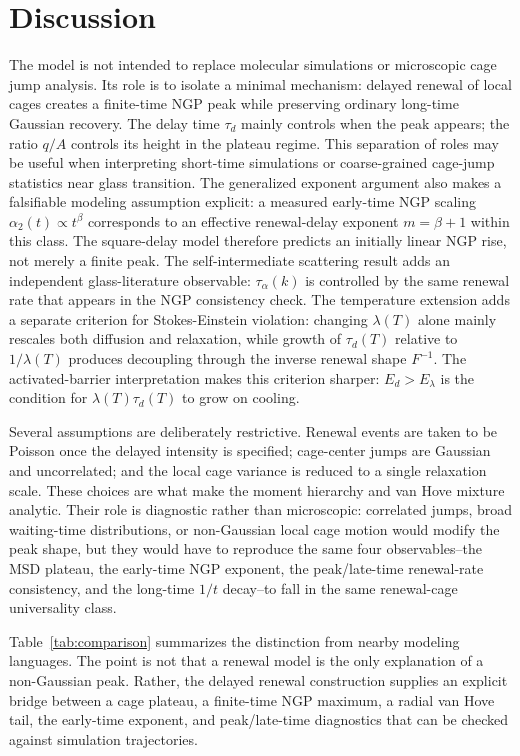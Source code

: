 \documentclass[aps,preprint,onecolumn,superscriptaddress,nofootinbib]{revtex4-2}
\begin{document}
\clearpage
\section{Discussion}

The model is not intended to replace molecular simulations or microscopic cage
jump analysis. Its role is to isolate a minimal mechanism: delayed renewal of
local cages creates a finite-time NGP peak while preserving ordinary long-time
Gaussian recovery. The delay time $\tau_d$ mainly controls when the peak
appears; the ratio $q/A$ controls its height in the plateau regime. This
separation of roles may be useful when interpreting short-time simulations or
coarse-grained cage-jump statistics near glass transition.
The generalized exponent argument also makes a falsifiable modeling
assumption explicit: a measured early-time NGP scaling
$\alpha_2(t)\propto t^\beta$ corresponds to an effective renewal-delay
exponent $m=\beta+1$ within this class. The square-delay model therefore
predicts an initially linear NGP rise, not merely a finite peak. The
self-intermediate scattering result adds an independent glass-literature
observable: $\tau_\alpha(k)$ is controlled by the same renewal rate that appears
in the NGP consistency check. The temperature extension adds a separate
criterion for Stokes-Einstein violation: changing $\lambda(T)$ alone mainly
rescales both diffusion and relaxation, while growth of $\tau_d(T)$ relative to
$1/\lambda(T)$ produces decoupling through the inverse renewal shape $F^{-1}$.
The activated-barrier interpretation makes this criterion sharper:
$E_d>E_\lambda$ is the condition for $\lambda(T)\tau_d(T)$ to grow on cooling.

Several assumptions are deliberately restrictive. Renewal events are taken to
be Poisson once the delayed intensity is specified; cage-center jumps are
Gaussian and uncorrelated; and the local cage variance is reduced to a single
relaxation scale. These choices are what make the moment hierarchy and van Hove
mixture analytic. Their role is diagnostic rather than microscopic: correlated
jumps, broad waiting-time distributions, or non-Gaussian local cage motion would
modify the peak shape, but they would have to reproduce the same four
observables--the MSD plateau, the early-time NGP exponent, the peak/late-time
renewal-rate consistency, and the long-time $1/t$ decay--to fall in the same
renewal-cage universality class.

Table~\ref{tab:comparison} summarizes the distinction from nearby modeling
languages. The point is not that a renewal model is the only explanation of a
non-Gaussian peak. Rather, the delayed renewal construction supplies an
explicit bridge between a cage plateau, a finite-time NGP maximum, a radial van
Hove tail, the early-time exponent, and peak/late-time diagnostics that can be
checked against simulation trajectories.
\end{document}
